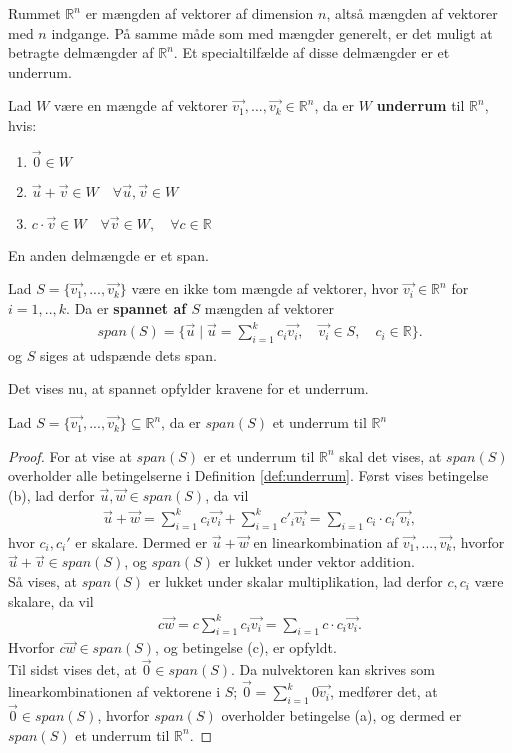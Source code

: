 \newline
Rummet $\mathds{R}^n$ er mængden af vektorer af dimension $n$, altså mængden af vektorer med $n$ indgange. På samme måde som med mængder generelt, er det muligt at betragte delmængder af $\mathds{R}^n$.
Et specialtilfælde af disse delmængder er et underrum.
\begin{defn}[Underrum]
Lad $W$ være en mængde af vektorer $\vec{v_1},...,\vec{v_k} \in \mathds{R}^n$, da er $W$  \textbf{underrum} til $\mathds{R}^n$, hvis:
\begin{enumerate}[label=(\alph*)]
\item $\vec{0} \in W$
\item $\vec{u}+\vec{v} \in W \quad \forall \vec{u}, \vec{v} \in W$
\item $c \cdot \vec{v} \in W \quad \forall \vec{v} \in W, \quad \forall c \in \mathds{R}$
\end{enumerate}
\label{def:underrum}
\end{defn}
En anden delmængde er et span.
\begin{defn}[Span]
Lad $S=\{\vec{v_1},...,\vec{v_k}\}$ være en ikke tom mængde af vektorer, hvor $\vec{v_i} \in \mathds{R}^n$ for $i = 1,..,k$. 
Da er \textbf{spannet af $S$} mængden af vektorer
\begin{align*}
span(S) = \{\vec{u} \mid \vec{u}=\sum_{i=1}^k c_i \vec{v_i}, \quad \vec{v_i} \in S, \quad c_i \in \mathds{R}\}.
\end{align*} 
og $S$ siges at udspænde dets span.
\label{def:span}
\end{defn}
Det vises nu, at spannet opfylder kravene for et underrum.
\begin{stn}
Lad $S=\{\vec{v_1},...,\vec{v_k}\} \subseteq \mathds{R}^n$, da er $span(S)$ et underrum til $\mathds{R}^n$
\label{stn:spanunderrum}
\end{stn}
\begin{proof}
For at vise at $span(S)$ er et underrum til $\mathds{R}^n$ skal det vises, at $span(S)$ overholder alle betingelserne i Definition \ref{def:underrum}.
Først vises betingelse (b), lad  derfor $\vec{u}, \vec{w} \in span(S)$, da vil 
\begin{align*}
\vec{u}+\vec{w}= \sum_{i=1}^k c_i \vec{v_i} + \sum_{i=1}^k c'_i \vec{v_i} = \sum_{i=1} c_i\cdot c_i' \vec{v_i},
\end{align*}
hvor $c_i, c_i'$ er skalare.
Dermed er $\vec{u}+\vec{w}$ en linearkombination af $\vec{v_1},...,\vec{v_k}$, hvorfor $\vec{u}+\vec{v} \in span(S)$, og $span(S)$ er lukket under vektor addition.
\\ Så vises, at $span(S)$ er lukket under skalar multiplikation, lad derfor $c, c_i$ være skalare, da vil
\begin{align*}
c\vec{w}= c\sum_{i=1}^k c_i \vec{v_i}  = \sum_{i=1} c \cdot c_i \vec{v_i}.
\end{align*}
Hvorfor $c\vec{w} \in span(S)$, og betingelse (c), er opfyldt.
\\Til sidst vises det, at $\vec{0} \in span(S)$.
Da nulvektoren kan skrives som linearkombinationen af vektorene i $S$; $\vec{0} = \sum_{i=1}^k 0 \vec{v_i}$, medfører det, at $\vec{0} \in span(S)$, hvorfor $span(S)$ overholder betingelse (a), og dermed er $span(S)$ et underrum til $\mathds{R}^n$.
\end{proof}
